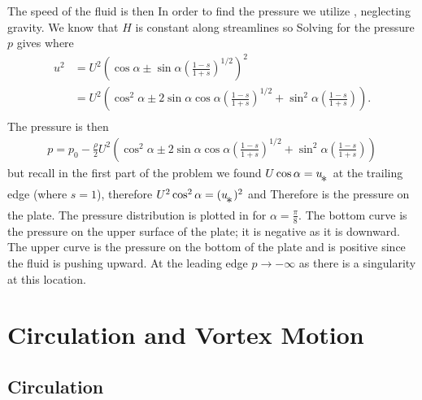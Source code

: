 \documentclass[12pt]{book}
\begin{document}
{The speed of the fluid is then
In order to find the pressure we utilize , neglecting gravity.  We know that $H$ is constant along streamlines so
Solving for the pressure $p$ gives
where
\begin{align*}
u^2 &= U^2\left(\cos\alpha \pm \sin\alpha \left(\frac{ 1-s}{1+s}\right)^{1/2}\right)^2 \\
    &= U^2\left(\cos^2\alpha \pm 2\sin\alpha\cos\alpha \left(\frac{ 1-s}{1+s}\right)^{1/2} + \sin^2\alpha \left(\frac{ 1-s}{1+s}\right)\right). \\
\end{align*}
The pressure is then
\begin{align*}
p = p_0 - \frac{\rho}{2} U^2\left(\cos^2\alpha \pm 2\sin\alpha\cos\alpha \left(\frac{ 1-s}{1+s}\right)^{1/2} + \sin^2\alpha \left(\frac{ 1-s}{1+s}\right)\right)
\end{align*}
but recall in the first part of the problem we found $U\cos\alpha = u\substar$ at the trailing edge (where $s=1$), therefore $U^2\cos^2\alpha = (u\substar)^2$ and
Therefore 
is the pressure on the plate.  The pressure distribution is plotted in  for $\alpha = \frac{\pi}{8}$.  The bottom curve is the pressure on the upper surface of the plate; it is negative as it is downward.  The upper curve is the pressure on the bottom of the plate and is positive since the fluid is pushing upward.  At the leading edge $p\rightarrow-\infty$ as there is a singularity at this location.
}%



\stopAssignment

\chapter{Circulation and Vortex Motion}


\section{Circulation}
\end{document}
